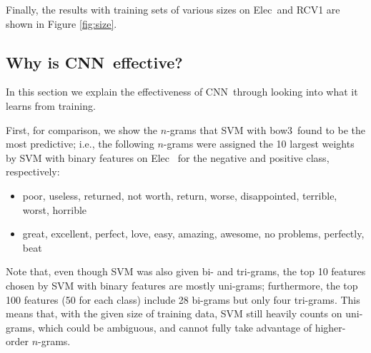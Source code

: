 \documentclass[11pt,letterpaper]{article}
\newcommand{\cnn}{CNN}
\newcommand{\bowthree}{{bow3}}
\newcommand{\Elec}{Elec}
\begin{document}
Finally, the results with training sets of various sizes on \Elec\ and RCV1 
are shown in Figure \ref{fig:size}.


\subsection{Why is \cnn\ effective?} 
\label{sec:examples}
In this section we explain the effectiveness of \cnn\ through 
looking into what it learns from training.  

First, for comparison,
we show the $n$-grams that SVM with \bowthree\ found to be the most predictive; i.e., 
the following $n$-grams were assigned the 10 largest weights by SVM with binary features on \Elec\ 
for the negative and positive class, respectively: 
\vspace{-0.1in}
\begin{itemize} \itemsep1pt \parskip0pt 
\item 
{\small
  poor, useless, returned, not worth, return, worse, disappointed, terrible, worst, horrible  %
}
\item
{\small
  great, excellent, perfect, love, easy, amazing, awesome, no problems, perfectly, beat
}  
\end{itemize}
\vspace{-0.05in}
Note that, even though SVM was also given bi- and tri-grams, 
the top 10 features chosen by SVM with binary features are mostly uni-grams; 
furthermore, the top 100 features (50 for each class) include 28 bi-grams but only four tri-grams. 
This means that, with the given size of training data, SVM still heavily counts on 
uni-grams, which could be ambiguous, and cannot fully take advantage of higher-order 
$n$-grams.
\end{document}
